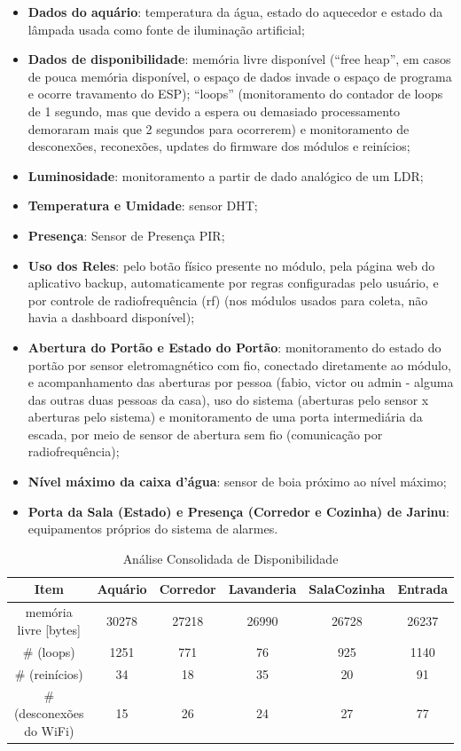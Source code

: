 \begin{itemize}
	\item \textbf{Dados do aquário}: temperatura da água, estado do aquecedor e estado da lâmpada usada como fonte de iluminação artificial;
	\item \textbf{Dados de disponibilidade}: memória livre disponível (“free heap”, em casos de pouca memória disponível, o espaço de dados invade o espaço de programa e ocorre travamento do ESP); “loops” (monitoramento do contador de loops de 1 segundo, mas que devido a espera ou demasiado processamento demoraram mais que 2 segundos para ocorrerem) e monitoramento de desconexões, reconexões, updates do firmware dos módulos e reinícios;
	\item \textbf{Luminosidade}: monitoramento a partir de dado analógico de um LDR;
	\item \textbf{Temperatura e Umidade}: sensor DHT;
	\item \textbf{Presença}: Sensor de Presença PIR;
	\item \textbf{Uso dos Reles}: pelo botão físico presente no módulo, pela página web do aplicativo backup, automaticamente por regras configuradas pelo usuário, e por controle de radiofrequência (rf) (nos módulos usados para coleta, não havia a dashboard disponível);
	\item \textbf{Abertura do Portão e Estado do Portão}: monitoramento do estado do portão por sensor eletromagnético com fio, conectado diretamente ao módulo, e acompanhamento das aberturas por pessoa (fabio, victor ou admin - alguma das outras duas pessoas da casa), uso do sistema (aberturas pelo sensor x aberturas pelo sistema) e monitoramento de uma porta intermediária da escada, por meio de sensor de abertura sem fio (comunicação por radiofrequência);
	\item \textbf{Nível máximo da caixa d’água}: sensor de boia próximo ao nível máximo;
	\item \textbf{Porta da Sala (Estado) e Presença (Corredor e Cozinha) de Jarinu}: equipamentos próprios do sistema de alarmes.

\end{itemize}

\begin{table}[H]
    \caption{Análise Consolidada de Disponibilidade}
    \setlength\tabcolsep{1.5pt}
    \centering
    \footnotesize
    \begin{tabular}{cccccc}
        \textbf{Item} & \textbf{Aquário} & \textbf{Corredor} & \textbf{Lavanderia} & \textbf{SalaCozinha} & \textbf{Entrada} \\
        \midrule
        memória livre [bytes] &
        30278 &
        27218 &
        26990 &
        26728 &
        26237 \\
        \# (loops) &
        1251 &
        771 &
        76 &
        925 &
        1140 \\
        \# (reinícios) &
        34 &
        18 &
        35 &
        20 &
        91 \\
        \# (desconexões do WiFi) &
        15 &
        26 &
        24 &
        27 &
        77 \\
    \end{tabular}
\end{table}


